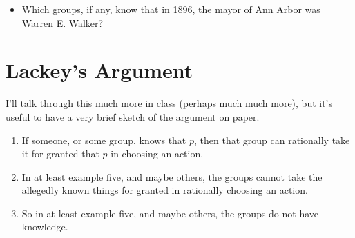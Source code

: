 \documentclass[11pt,]{article}
\providecommand{\tightlist}{%
  \setlength{\itemsep}{0pt}\setlength{\parskip}{0pt}}
\begin{document}
\begin{itemize}
\tightlist
\item
  Which groups, if any, know that in 1896, the mayor of Ann Arbor was
  Warren E. Walker?
\end{itemize}

\hypertarget{lackeys-argument}{%
\section{Lackey's Argument}\label{lackeys-argument}}

I'll talk through this much more in class (perhaps much much more), but
it's useful to have a very brief sketch of the argument on paper.

\begin{enumerate}
\def\labelenumi{\arabic{enumi}.}
\tightlist
\item
  If someone, or some group, knows that \(p\), then that group can
  rationally take it for granted that \(p\) in choosing an action.
\item
  In at least example five, and maybe others, the groups cannot take the
  allegedly known things for granted in rationally choosing an action.
\item
  So in at least example five, and maybe others, the groups do not have
  knowledge.
\end{enumerate}
\end{document}
